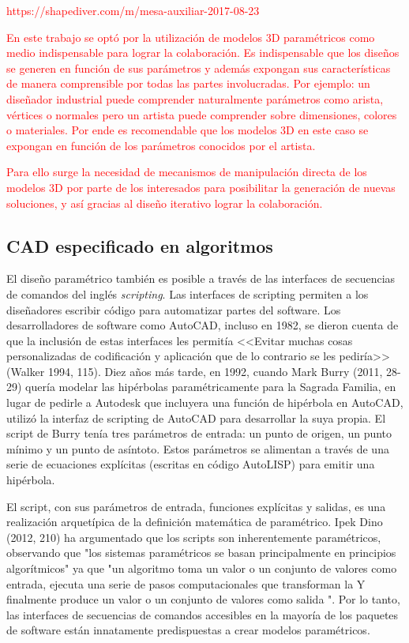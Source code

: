 \textcolor{red}{


https://shapediver.com/m/mesa-auxiliar-2017-08-23


En este trabajo se optó por la utilización de modelos 3D paramétricos como medio indispensable para lograr la colaboración. Es indispensable que los diseños se generen en función de sus parámetros y además expongan sus características de manera comprensible por todas las partes involucradas. Por ejemplo: un diseñador industrial puede comprender naturalmente parámetros como arista, vértices o normales pero un artista puede comprender sobre dimensiones, colores o materiales. Por ende es recomendable que los modelos 3D en este caso se expongan en función de los parámetros conocidos por el artista.}
\textcolor{red}{Para ello surge la necesidad de mecanismos de manipulación directa de los modelos 3D por parte de los interesados para posibilitar la generación de nuevas soluciones, y así gracias al diseño iterativo lograr la colaboración.}



\subsection{CAD especificado en algoritmos} 
El diseño paramétrico también es posible a través de las interfaces de secuencias de comandos del inglés \textit{scripting}. Las interfaces de scripting permiten a los diseñadores escribir código para automatizar partes del software. Los desarrolladores de software como AutoCAD, incluso en 1982, se dieron cuenta de que la inclusión de estas interfaces les permitía <<Evitar muchas cosas personalizadas de codificación y aplicación que de lo contrario se les pediría>> (Walker 1994, 115). Diez años más tarde, en 1992, cuando Mark Burry (2011, 28-29) quería modelar las hipérbolas paramétricamente para la Sagrada Familia, en lugar de pedirle a Autodesk que incluyera una función de hipérbola en AutoCAD, utilizó la interfaz de scripting de AutoCAD para desarrollar la suya propia. El script de Burry tenía tres parámetros de entrada: un punto de origen, un punto mínimo y un punto de asíntoto. Estos parámetros se alimentan a través de una serie de ecuaciones explícitas (escritas en código AutoLISP) para emitir una hipérbola. 

El script, con sus parámetros de entrada, funciones explícitas y salidas, es una realización arquetípica de la definición matemática de paramétrico. Ipek Dino (2012, 210) ha argumentado que los scripts son inherentemente paramétricos, observando que "los sistemas paramétricos se basan principalmente en principios algorítmicos" ya que "un algoritmo toma un valor o un conjunto de valores como entrada, ejecuta una serie de pasos computacionales que transforman la Y finalmente produce un valor o un conjunto de valores como salida ". Por lo tanto, las interfaces de secuencias de comandos accesibles en la mayoría de los paquetes de software están innatamente predispuestas a crear modelos paramétricos.

